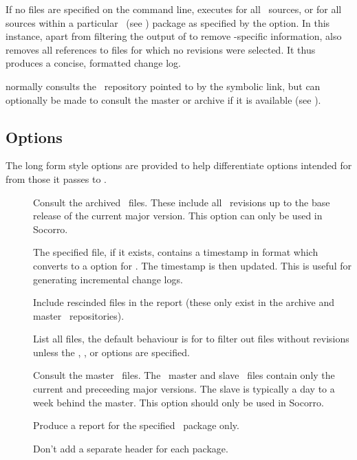 If no files are specified on the command line,  executes
 for all \aipspp\ sources, or for all sources within a
particular \aipspp\ (see ) package as specified by the
 option.  In this instance, apart from filtering the output of
 to remove \rcs-specific information,  also removes
all references to files for which no revisions were selected.  It thus
produces a concise, formatted change log.

 normally consults the \rcs\ repository pointed to by the
 symbolic link, but can optionally be made to consult the
master or archive if it is available (see ).

\subsection*{Options}

The long form  style options are provided to help differentiate
options intended for  from those it passes to .

\begin{description}
\item[]
   Consult the archived \rcs\ files.  These include all \rcs\ revisions up to
   the base release of the current major version.  This option can only be
   used in Socorro.

\item[]
   The specified file, if it exists, contains a timestamp in 
   format which  converts to a  option for
   .  The timestamp is then updated.  This is useful for
   generating incremental change logs.

\item[]
   Include rescinded files in the report (these only exist in the archive and
   master \rcs\ repositories).

\item[]
   List all files, the default behaviour is for  to filter out files
   without revisions unless the , , or  
   options are specified.

\item[]
   Consult the master \rcs\ files.  The \aipspp\ master and slave
   \rcs\ files contain only the current and preceeding major versions.  The
   slave is typically a day to a week behind the master.  This option should
   only be used in Socorro.

\item[]
   Produce a report for the specified \aipspp\ package only.

\item[]
   Don't add a separate header for each package.
\end{description}

